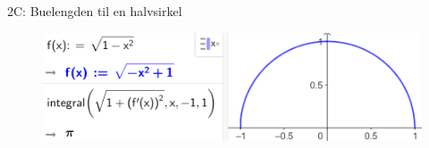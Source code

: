 \greenheader
\begin{frame}{2C: Buelengden til en halvsirkel}
\begin{figure}
    \centering
    \includegraphics[width=1\linewidth]{R2K1C-4.png}
\end{figure}
\end{frame}
